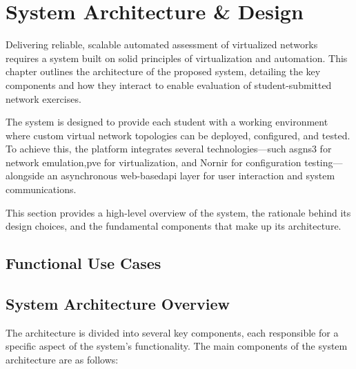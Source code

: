 
\chapter{System Architecture \& Design}


\label{Chapter4SystemArchitectureDesign}


Delivering reliable, scalable automated assessment of virtualized networks requires a system built on solid principles of 
virtualization and automation. This chapter outlines the architecture of the proposed system, detailing the key components 
and how they interact to enable evaluation of student-submitted network exercises.

The system is designed to provide each student with a working environment where custom virtual network topologies can be 
deployed, configured, and tested. To achieve this, the platform integrates several technologies—such as\ac{gns3} for network 
emulation,\ac{pve} for virtualization, and Nornir for configuration testing—alongside an asynchronous web-based\ac{api} layer for 
user interaction and system communications.

This section provides a high-level overview of the system, the rationale behind its design choices, and the fundamental 
components that make up its architecture.

\section{Functional Use Cases}

\section{System Architecture Overview}
    The architecture is divided into several key components, each responsible for a specific aspect of the system's functionality. 
    The main components of the system architecture are as follows:

